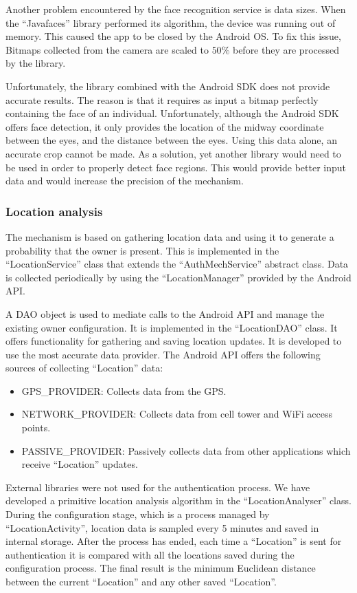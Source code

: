 Another problem encountered by the face recognition service is data sizes. When the ``Javafaces'' library performed its algorithm, the device was running out of memory. This caused the app to be closed by the Android OS. To fix this issue, Bitmaps collected from the camera are scaled to $50\%$ before they are processed by the library.

Unfortunately, the library combined with the Android SDK does not provide accurate results. The reason is that it requires as input a bitmap perfectly containing the face of an individual. Unfortunately, although the Android SDK offers face detection, it only provides the location of the midway coordinate between the eyes, and the distance between the eyes. Using this data alone, an accurate crop cannot be made. As a solution, yet another library would need to be used in order to properly detect face regions. This would provide better input data and would increase the precision of the mechanism.

\subsubsection{Location analysis}
The mechanism is based on gathering location data and using it to generate a probability that the owner is present. This is implemented in the ``LocationService'' class that extends the ``AuthMechService'' abstract class. Data is collected periodically by using the ``LocationManager'' provided by the Android API.

A DAO object is used to mediate calls to the Android API and manage the existing owner configuration. It is implemented in the ``LocationDAO'' class. It offers functionality for gathering and saving location updates. It is developed to use the most accurate data provider. The Android API offers the following sources of collecting ``Location'' data:
\begin{itemize}
	\item GPS\_PROVIDER: Collects data from the GPS.
	\item NETWORK\_PROVIDER: Collects data from cell tower and WiFi access points.
	\item PASSIVE\_PROVIDER: Passively collects data from other applications which receive ``Location'' updates.
\end{itemize}

External libraries were not used for the authentication process. We have developed a primitive location analysis algorithm in the ``LocationAnalyser'' class. During the configuration stage, which is a process managed by ``LocationActivity'', location data is sampled every 5 minutes and saved in internal storage. After the process has ended, each time a ``Location'' is sent for authentication it is compared with all the locations saved during the configuration process. The final result is the minimum Euclidean distance between the current ``Location'' and any other saved ``Location''. 

